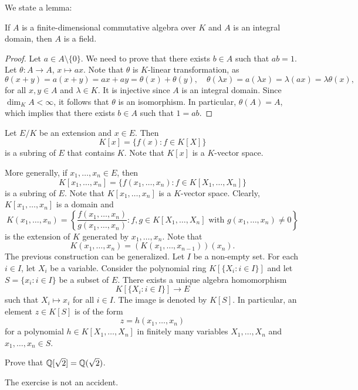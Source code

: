 We state a lemma:

\begin{lemma}
If $A$ is a finite-dimensional commutative algebra over $K$ 
and $A$ is an integral domain, then $A$ is a field. 
\end{lemma}

\begin{proof}
	Let $a\in A\setminus\{0\}$. We need to prove that there exists $b\in A$
	such that $ab=1$. Let $\theta\colon A\to A$, $x\mapsto ax$. Note that 
	$\theta$ is $K$-linear transformation, as 
    \[
    \theta(x+y)=a(x+y)=ax+ay=\theta(x)+\theta(y),\quad
    \theta(\lambda x)=a(\lambda x)=\lambda (ax)=\lambda\theta(x),
    \]
    for all $x,y\in A$ and $\lambda\in K$. 
 It is injective since $A$ is an
	integral domain.  Since $\dim_KA<\infty$, it follows that $\theta$ is an
	isomorphism. In particular, $\theta(A)=A$, which implies that there exists
	$b\in A$ such that $1=ab$. 
\end{proof}

Let $E/K$ be an extension and $x\in E$. 
Then 
\[
K[x]=\{f(x): f\in K[X]\}
\]
is a subring of $E$ that contains $K$. Note that 
$K[x]$ is a $K$-vector space. 

More generally,
if $x_1,\dots,x_n\in E$, then
\[
K[x_1,\dots,x_n]=\{f(x_1,\dots,x_n):f\in K[X_1,\dots,X_n]\}
\]
is a subring of $E$. 
Note that $K[x_1,\dots,x_n]$ is a $K$-vector space. 
Clearly, $K[x_1,\dots,x_n]$ is a domain
and 
\[
K(x_1,\dots,x_n)=\left\{\frac{f(x_1,\dots,x_n)}{g(x_1,\dots,x_n)}:f,g\in K[X_1,\dots,X_n]\text{ with $g(x_1,\dots,x_n)\ne 0$}\right\}
\]
is the extension of $K$ generated by $x_1,\dots,x_n$. 
Note that 
\[
K(x_1,\dots,x_n)=(K(x_1,\dots,x_{n-1}))(x_n).
\]
The previous construction
can be generalized. Let $I$ be a non-empty set. 
For each $i\in I$, let $X_i$ be a variable. Consider
the polynomial ring $K[\{X_i:i\in I\}]$ and let 
$S=\{x_i:i\in I\}$ be a subset of $E$. There exists a unique 
algebra homomorphism 
\[
K[\{X_i:i\in I\}]\to E
\]
such that $X_i\mapsto x_i$ for all $i\in I$. The image 
is denoted by $K[S]$. In particular, an element $z\in K[S]$ 
is of the form 
\[
z=h(x_1,\dots,x_n)
\]
for a polynomial $h\in K[X_1,\dots,X_n]$ 
in finitely many variables $X_1,\dots,X_n$ and 
$x_1,\dots,x_n\in S$. 

\begin{exercise}
    Prove that $\mathbb{Q}[\sqrt{2}]=\mathbb{Q}(\sqrt{2})$. 
\end{exercise}

The exercise is not an accident. 

